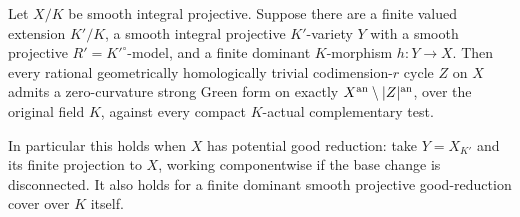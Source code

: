 \begin{corollary}
\label{r11p:potential-good-G}
Let $X/K$ be smooth integral projective.  Suppose there are a finite
valued extension $K'/K$, a smooth integral projective $K'$-variety
$Y$ with a smooth projective $R'=K'^\circ$-model, and a finite
dominant $K$-morphism $h:Y\to X$.  Then every rational geometrically
homologically trivial codimension-$r$ cycle $Z$ on $X$ admits a
zero-curvature strong Green form on exactly
$X^{\rm an}\setminus|Z|^{\rm an}$, over the original field $K$,
against every compact $K$-actual complementary test.

In particular this holds when $X$ has potential good reduction:
take $Y=X_{K'}$ and its finite projection to $X$, working componentwise
if the base change is disconnected.
It also holds for a finite dominant smooth projective good-reduction
cover over $K$ itself.
\end{corollary}

